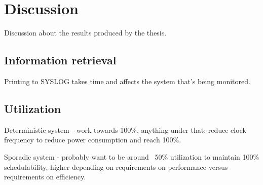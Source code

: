 \chapter{Discussion}
Discussion about the results produced by the thesis.

\section{Information retrieval}
Printing to SYSLOG takes time and affects the system that's being monitored.

\section{Utilization}
Deterministic system - work towards 100\%, anything under that: reduce clock frequency to reduce power consumption and reach 100\%.

Sporadic system - probably want to be around ~50\% utilization to maintain 100\% schedulability, higher depending on requirements on performance versus requirements on efficiency.